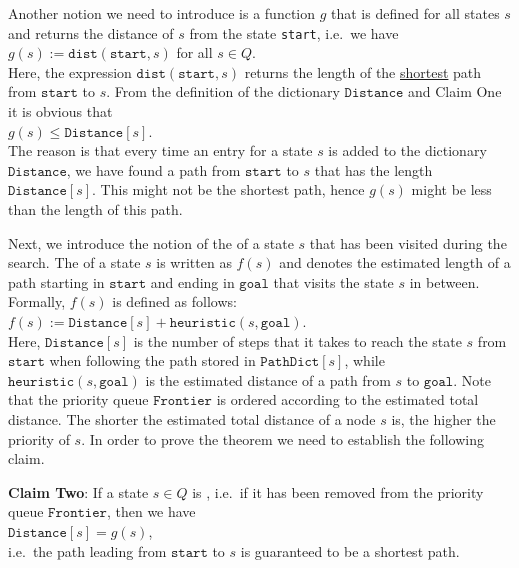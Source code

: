Another notion we need to introduce is a function $g$ that is defined for all states $s$ and returns the
distance of $s$ from the state \texttt{start}, i.e.~we have
\\[0.2cm]
\hspace*{1.3cm}
$g(s) := \texttt{dist}(\texttt{start}, s)$ \quad for all $s \in Q$.
\\[0.2cm]
Here, the expression $\texttt{dist}(\texttt{start}, s)$ returns the length of the \underline{shortest} path from
$\texttt{start}$ to $s$.  From the definition of the dictionary $\texttt{Distance}$ and Claim One it is obvious that
\\[0.2cm]
\hspace*{1.3cm}
$g(s) \leq \texttt{Distance}[s]$.
\\[0.2cm]
The reason is that every time an entry for a state $s$ is added to the dictionary $\texttt{Distance}$, we have
found a path from $\texttt{start}$ to $s$ that has the length $\texttt{Distance}[s]$.  This might not be the
shortest path, hence $g(s)$ might be less than the length of this path.

Next, we introduce the notion of the  of a state $s$ that has been visited
during the search.  The  of a state $s$ is written as $f(s)$ and denotes the
estimated length of a path starting in $\texttt{start}$ and ending in $\texttt{goal}$ that visits the state $s$ in
between.  Formally, $f(s)$ is defined as follows:
\\[0.2cm]
\hspace*{1.3cm}
$f(s) := \texttt{Distance}[s] + \texttt{heuristic}(s, \mathtt{goal})$.
\\[0.2cm]
Here, $\texttt{Distance}[s]$ is the number of steps that it takes to reach the state $s$ from $\texttt{start}$
when following the path stored in $\mathtt{PathDict}[s]$,
while $\texttt{heuristic}(s, \mathtt{goal})$ is the estimated distance of a path from $s$ to $\texttt{goal}$.  Note that
the priority queue $\texttt{Frontier}$ is ordered according to the estimated total distance.
The shorter the estimated total distance of a node $s$ is, the higher the priority of $s$. 
In order to prove the theorem we need to establish the following claim.
\vspace*{0.2cm}

\noindent
\textbf{Claim Two}: If a state $s \in Q$ is , i.e.~if it has been removed from the priority
queue $\mathtt{Frontier}$, then we have 
\\[0.2cm]
\hspace*{1.3cm}
$\texttt{Distance}[s] = g(s)$,
\\[0.2cm]
i.e.~the path leading from $\texttt{start}$ to $s$ is guaranteed to be a shortest path.
\vspace*{0.2cm}

